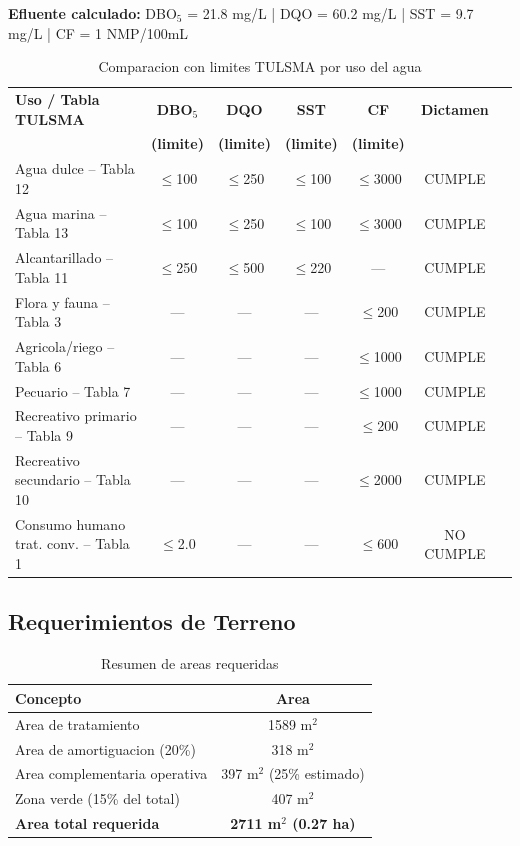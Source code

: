 \documentclass[12pt,a4paper]{article}
\begin{document}
\textbf{Efluente calculado:} DBO$_5$ = 21.8 mg/L | DQO = 60.2 mg/L | SST = 9.7 mg/L | CF = 1 NMP/100mL

\vspace{0.5em}
\begin{table}[H]
\centering
\small
\caption{Comparacion con limites TULSMA por uso del agua}
\begin{tabular}{lcccccc}
\toprule
\textbf{Uso / Tabla TULSMA} & \textbf{DBO$_5$} & \textbf{DQO} & \textbf{SST} & \textbf{CF} & \textbf{Dictamen} \\
& \textbf{(limite)} & \textbf{(limite)} & \textbf{(limite)} & \textbf{(limite)} & \\
\midrule
Agua dulce -- Tabla 12 & $\leq$100 & $\leq$250 & $\leq$100 & $\leq$3000 & CUMPLE \\
Agua marina -- Tabla 13 & $\leq$100 & $\leq$250 & $\leq$100 & $\leq$3000 & CUMPLE \\
Alcantarillado -- Tabla 11 & $\leq$250 & $\leq$500 & $\leq$220 & --- & CUMPLE \\
Flora y fauna -- Tabla 3 & --- & --- & --- & $\leq$200 & CUMPLE \\
Agricola/riego -- Tabla 6 & --- & --- & --- & $\leq$1000 & CUMPLE \\
Pecuario -- Tabla 7 & --- & --- & --- & $\leq$1000 & CUMPLE \\
Recreativo primario -- Tabla 9 & --- & --- & --- & $\leq$200 & CUMPLE \\
Recreativo secundario -- Tabla 10 & --- & --- & --- & $\leq$2000 & CUMPLE \\
Consumo humano trat. conv. -- Tabla 1 & $\leq$2.0 & --- & --- & $\leq$600 & NO CUMPLE \\
\bottomrule
\end{tabular}
\end{table}

\subsection{Requerimientos de Terreno}

\begin{table}[H]
\centering
\caption{Resumen de areas requeridas}
\begin{tabular}{lc}
\toprule
\textbf{Concepto} & \textbf{Area} \\
\midrule
Area de tratamiento & 1589 m$^2$ \\
Area de amortiguacion (20\%) & 318 m$^2$ \\
Area complementaria operativa & 397 m$^2$ (25\% estimado) \\
Zona verde (15\% del total) & 407 m$^2$ \\
\midrule
\textbf{Area total requerida} & \textbf{2711 m$^2$ (0.27 ha)} \\
\bottomrule
\end{tabular}
\end{table}
\end{document}
